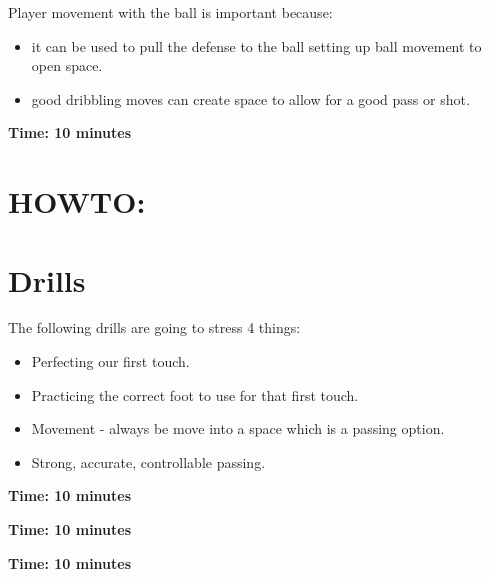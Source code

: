 \documentclass[10pt,letterpaper]{article}
\newenvironment{myalertblock}[1]{%
    \tcolorbox[beamer,%
    noparskip,breakable,
    colback=LightCoral,colframe=DarkRed,%
    colbacklower=Tomato!75!LightCoral,%
    title=#1]}%
    {\endtcolorbox}
\begin{document}
\begin{myalertblock}{Theme of the Practice}
    Player movement with the ball is important because:
    \begin{itemize}
        \setlength{\itemsep}{0pt}
        \setlength{\parskip}{0pt}
        \setlength{\parsep}{0pt}
        \item it can be used to pull the defense to the ball setting up ball movement to open space.
        \item good dribbling moves can create space to allow for a good pass or shot.
    \end{itemize}

\end{myalertblock}

\textbf{Time: 10 minutes}


\section{HOWTO:}


\clearpage

\section{Drills}

The following drills are going to stress 4 things:
\begin{itemize}
    \setlength{\itemsep}{0pt}
    \setlength{\parskip}{0pt}
    \setlength{\parsep}{0pt}
    \item Perfecting our first touch.
    \item Practicing the correct foot to use for that first touch.
    \item Movement - always be move into a space which is a passing option.
    \item Strong, accurate, controllable passing.
\end{itemize}

\textbf{Time: 10 minutes}


\textbf{Time: 10 minutes}


\clearpage

\textbf{Time: 10 minutes}



%
\end{document}
